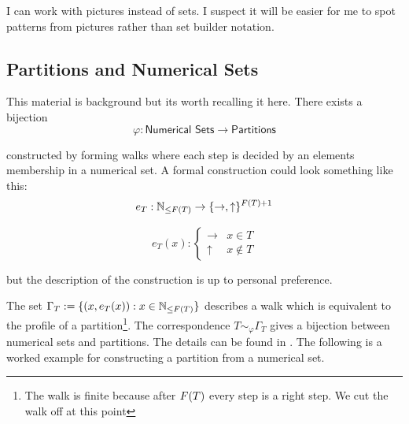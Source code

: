 \begin{tldrbox}
    I can work with pictures instead of sets. I suspect it will be easier for me to spot patterns from pictures rather than set builder notation.
\end{tldrbox}

\subsection{Partitions and Numerical Sets}

This material is background but its worth recalling it here. There exists a bijection
\[\varphi: \textsf{Numerical Sets} \to \textsf{Partitions}\]

constructed by forming walks where each step is decided by an elements membership in a numerical set. A formal construction could look something like this:
\[e_T: \mathbb{N}_{\le F(T)} \to \{\rightarrow, \uparrow\}^{F(T) + 1}\]

\[e_T(x): \begin{cases} \rightarrow & x \in T \\ \uparrow & x \not\in T\end{cases}\]

but the description of the construction is up to personal preference.

The set \(\Gamma_T := \{(x, e_T(x)): x \in \mathbb{N}_{\le F(T)}\}\) describes a walk which is equivalent to the profile of a partition\footnote{The walk is finite because after \(F(T)\) every step is a right step. We cut the walk off at this point}. The correspondence \(T \sim_\varphi \Gamma_T\) gives a bijection between numerical sets and partitions. The details can be found in \cite{Constantin2017}. The following is a worked example for constructing a partition from a numerical set.

